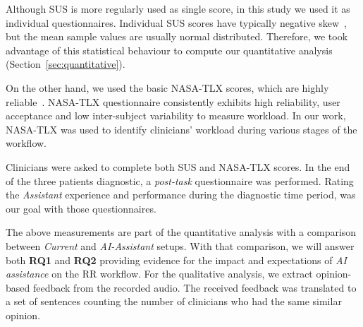 
Although SUS is more regularly used as single score, in this study we used it as individual questionnaires.
Individual SUS scores have typically negative skew~\cite{lewis2018system}, but the mean sample values are usually normal distributed.
Therefore, we took advantage of this statistical behaviour to compute our quantitative analysis (Section~\ref{sec:quantitative}).

On the other hand, we used the basic NASA-TLX scores, which are highly reliable~\cite{ramkumar2017using}.
NASA-TLX questionnaire consistently exhibits high reliability, user acceptance and low inter-subject variability to measure workload.
In our work, NASA-TLX was used to identify clinicians' workload during various stages of the workflow.

Clinicians were asked to complete both SUS and NASA-TLX scores.
In the end of the three patients diagnostic, a {\it post-task} questionnaire was performed.
Rating the {\it Assistant} experience and performance during the diagnostic time period, was our goal with those questionnaires.

The above measurements are part of the quantitative analysis with a comparison between {\it Current} and {\it AI-Assistant} setups.
With that comparison, we will answer both {\bf RQ1} and {\bf RQ2} providing evidence for the impact and expectations of {\it AI assistance} on the RR workflow.
For the qualitative analysis, we extract opinion-based feedback from the recorded audio.
The received feedback was translated to a set of sentences counting the number of clinicians who had the same similar opinion.